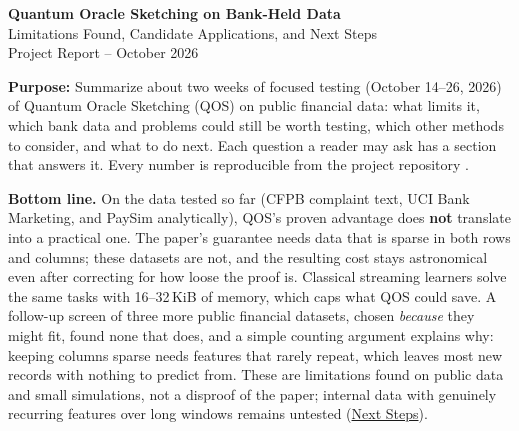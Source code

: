 \documentclass[10pt]{article}
\begin{document}
\begin{center}
    {\Large \textbf{Quantum Oracle Sketching on Bank-Held Data}}\\[2mm]
    {\small Limitations Found, Candidate Applications, and Next Steps}\\[1mm]
    {\small Project Report -- October 2026}
\end{center}

\vspace{3mm}

\textbf{Purpose:}
Summarize about two weeks of focused testing (October 14--26, 2026) of Quantum Oracle Sketching (QOS) \cite{zhao2026} on public financial data: what limits it, which bank data and problems could still be worth testing, which other methods to consider, and what to do next. Each question a reader may ask has a section that answers it. Every number is reproducible from the project repository \cite{repo}.

\vspace{2mm}

\begin{tcolorbox}[colback=gray!6,colframe=gray!55,boxrule=0.5pt,arc=1pt,left=6pt,right=6pt,top=4pt,bottom=4pt]
\textbf{Bottom line.}
On the data tested so far (CFPB complaint text, UCI Bank Marketing, and PaySim analytically), QOS's proven advantage does \textbf{not} translate into a practical one. The paper's guarantee needs data that is sparse in both rows and columns; these datasets are not, and the resulting cost stays astronomical even after correcting for how loose the proof is. Classical streaming learners solve the same tasks with 16--32\,KiB of memory, which caps what QOS could save. A follow-up screen of three more public financial datasets, chosen \emph{because} they might fit, found none that does, and a simple counting argument explains why: keeping columns sparse needs features that rarely repeat, which leaves most new records with nothing to predict from. These are limitations found on public data and small simulations, not a disproof of the paper; internal data with genuinely recurring features over long windows remains untested (\hyperref[sec:next]{Next Steps}).
\end{tcolorbox}
\end{document}
